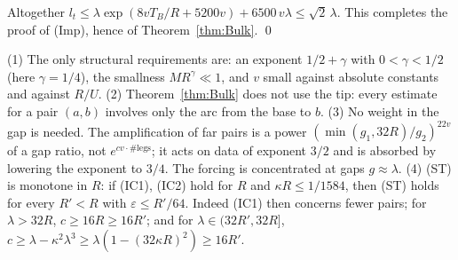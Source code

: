 Altogether $l_t\le\lambda\exp(8vT_B/R+5200v)+6500\,v\lambda\le\sqrt2\,\lambda$. This completes the proof of (Imp), hence of
Theorem~\ref{thm:Bulk}. \qed

\begin{remark}\label{rem:B-B}
(1) The only structural requirements are: an exponent $1/2+\gamma$ with $0<\gamma<1/2$ (here $\gamma=1/4$), the smallness
$MR^\gamma\ll1$, and $v$ small against absolute constants and against $R/U$.
(2) Theorem~\ref{thm:Bulk} does not use the tip: every estimate for a pair $(a,b)$ involves only the arc from the base to $b$.
(3) No weight in the gap is needed. The amplification of far pairs is a power $(\min(g_1,32R)/g_2)^{22v}$ of a gap ratio, not
$e^{cv\cdot\#\mathrm{legs}}$; it acts on data of exponent $3/2$ and is absorbed by lowering the exponent to $3/4$. The forcing is
concentrated at gaps $g\approx\lambda$.
(4) \textup{(ST)} is monotone in $R$: if (IC1), (IC2) hold for $R$ and $\kappa R\le1/1584$, then \textup{(ST)} holds for every
$R'<R$ with $\varepsilon\le R'/64$. Indeed (IC1) then concerns fewer pairs; for $\lambda>32R$, $c\ge16R\ge16R'$; and for
$\lambda\in(32R',32R]$, $c\ge\lambda-\kappa^2\lambda^3\ge\lambda(1-(32\kappa R)^2)\ge16R'$.
\end{remark}

